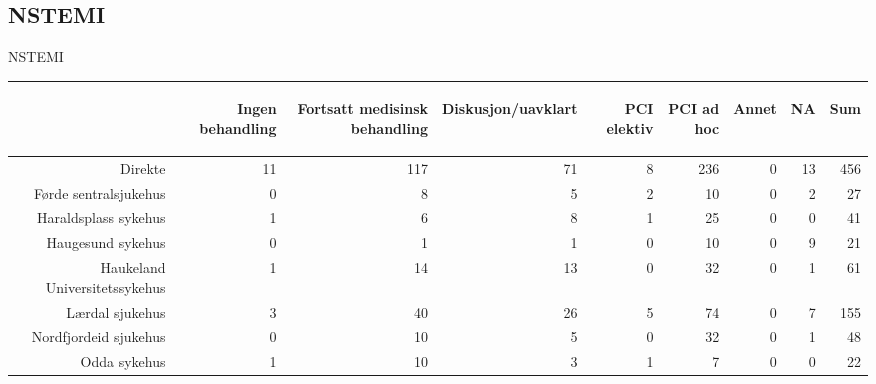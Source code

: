 \documentclass[presentation,xcolor=pdftex,dvipsnames,table]{beamer}
\begin{document}
\subsection{NSTEMI}

\begin{frame}
\begin{Huge}
NSTEMI
\end{Huge}
\end{frame}


\begin{frame}
\begin{tiny}
\begin{table}[ht]
\centering
\begin{tabular}{rrrrrrrrr}
  \toprule
 & \begin{sideways} Ingen behandling \end{sideways} & \begin{sideways} Fortsatt medisinsk behandling \end{sideways} & \begin{sideways} Diskusjon/uavklart \end{sideways} & \begin{sideways} PCI elektiv \end{sideways} & \begin{sideways} PCI ad hoc \end{sideways} & \begin{sideways} Annet \end{sideways} & \begin{sideways} NA \end{sideways} & \begin{sideways} Sum \end{sideways} \\ 
  \midrule
Direkte & 11 & 117 & 71 & 8 & 236 & 0 & 13 & 456 \\ 
  Førde sentralsjukehus & 0 & 8 & 5 & 2 & 10 & 0 & 2 & 27 \\ 
  Haraldsplass sykehus & 1 & 6 & 8 & 1 & 25 & 0 & 0 & 41 \\ 
  Haugesund sykehus & 0 & 1 & 1 & 0 & 10 & 0 & 9 & 21 \\ 
  Haukeland Universitetssykehus & 1 & 14 & 13 & 0 & 32 & 0 & 1 & 61 \\ 
  Lærdal sjukehus & 3 & 40 & 26 & 5 & 74 & 0 & 7 & 155 \\ 
  Nordfjordeid sjukehus & 0 & 10 & 5 & 0 & 32 & 0 & 1 & 48 \\ 
  Odda sykehus & 1 & 10 & 3 & 1 & 7 & 0 & 0 & 22 \\ 

\end{tabular}
\end{table}
\end{tiny}
\end{frame}
\end{document}
